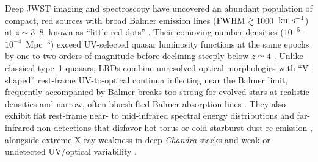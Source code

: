 \documentclass[twocolumn,linenumbers]{aastex701}
\newcommand{\kms}{\ensuremath{{\rm km\,s^{-1}}}}
\begin{document}
Deep JWST imaging and spectroscopy have uncovered an abundant population of compact, red sources with broad Balmer emission lines (${\rm FWHM}\gtrsim1000$~\kms{}) at $z\sim3$--8, known as ``little red dots'' \citep[LRDs;][]{Matthee2024,Greene2024,Kocevski2025}.
Their comoving number densities ($10^{-5}$--$10^{-4}$~Mpc$^{-3}$) exceed UV-selected quasar luminosity functions at the same epochs by one to two orders of magnitude before declining steeply below $z\simeq4$ \citep{Kocevski2025,Akins2025,Inayoshi2025}.
Unlike classical type~1 quasars, LRDs combine unresolved optical morphologies with ``V-shaped'' rest-frame UV-to-optical continua inflecting near the Balmer limit, frequently accompanied by Balmer breaks too strong for evolved stars at realistic densities \citep{Setton2025Vshape,InayoshiMaiolino2025,deGraaffRuby2025,NaiduBHStar2026,Hviding2025} and narrow, often blueshifted Balmer absorption lines \citep{Matthee2024,InayoshiMaiolino2025,DEugenio2026,Shangguan2026,ChenCH2026}.
They also exhibit flat rest-frame near- to mid-infrared spectral energy distributions and far-infrared non-detections that disfavor hot-torus or cold-starburst dust re-emission \citep{Williams2024,Akins2025,Setton2025IR,Greene2026,Iani2026}, alongside extreme X-ray weakness in deep \emph{Chandra} stacks \citep{Ananna2024,Yue2024} and weak or undetected UV/optical variability \citep{Kokubo2025,Zhang2025,Furtak2025,Burke2025}.
\end{document}

